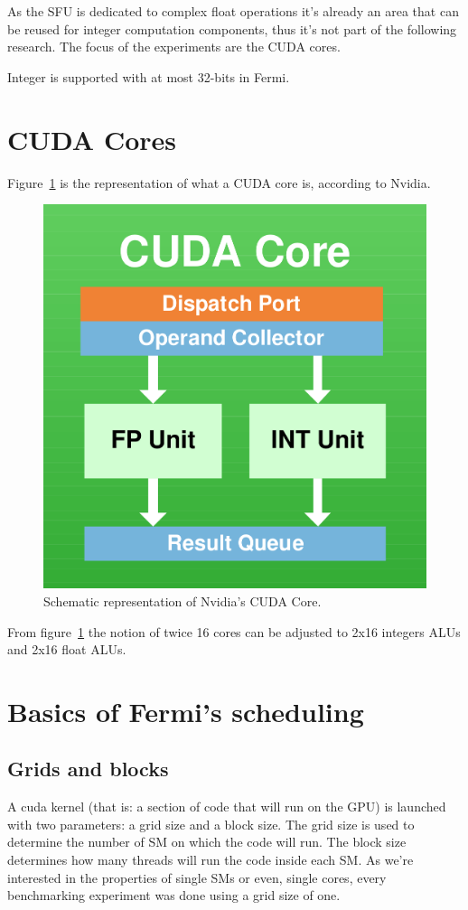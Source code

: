 \documentclass{report}
\begin{document}
    As the SFU is dedicated to complex float operations it's already an area
    that can be reused for integer computation components, thus it's not part
    of the following research. The focus of the experiments are the CUDA cores.
    
    Integer is supported with at most 32-bits in Fermi.

    \section{CUDA Cores}
    Figure~\ref{fig:CUDACore} is the representation of what a CUDA core is,
    according to Nvidia\cite{fermiwhitepap}.
    
    \begin{figure}[H]
    \centering
        \includegraphics[width=0.5\linewidth]{pictures/CUDACore}
        \captionsetup{justification=centering}
        \caption{Schematic representation of Nvidia's CUDA Core.}
        \label{fig:CUDACore}
    \end{figure}
    
    From figure~\ref{fig:CUDACore} the notion of twice 16 cores can be
    adjusted to 2x16 integers ALUs and 2x16 float ALUs.

    \section{Basics of Fermi's scheduling}
        \subsection{Grids and blocks} 
        A cuda kernel (that is: a section of code that will run on the GPU) is
        launched with two parameters: a grid size and a block size. The grid 
        size is used to determine the number of SM on which the code will run.
        The block size determines how many threads will run the code inside each
        SM\cite{cudaprog}. As we're interested in the properties of single SMs or even, single
        cores, every benchmarking experiment was done using a grid size of one.
\end{document}
